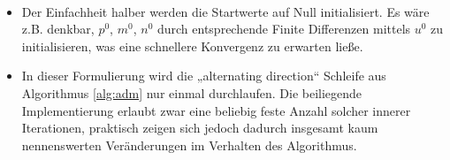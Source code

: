 \documentclass{mythesis}
\begin{document}
\begin{algorithm} \label{alg:ee}
     \\
    \begin{algorithmic}
	\EndFor
    \end{algorithmic}
    \begin{note}
	\begin{itemize}
	    \item
		Der Einfachheit halber werden die Startwerte auf Null initialisiert.
		Es wäre z.B. denkbar, $p^0$, $m^0$, $n^0$ durch entsprechende Finite Differenzen mittels $u^0$ zu initialisieren, was eine schnellere Konvergenz zu erwarten ließe.
	    \item
		In dieser Formulierung wird die „alternating direction“ Schleife aus Algorithmus \ref{alg:adm} nur einmal durchlaufen.
		Die beiliegende Implementierung erlaubt zwar eine beliebig feste Anzahl solcher innerer Iterationen, praktisch zeigen sich jedoch dadurch insgesamt kaum nennenswerten Veränderungen im Verhalten des Algorithmus.

\end{itemize}
\end{note}
\end{algorithm}
\end{document}
